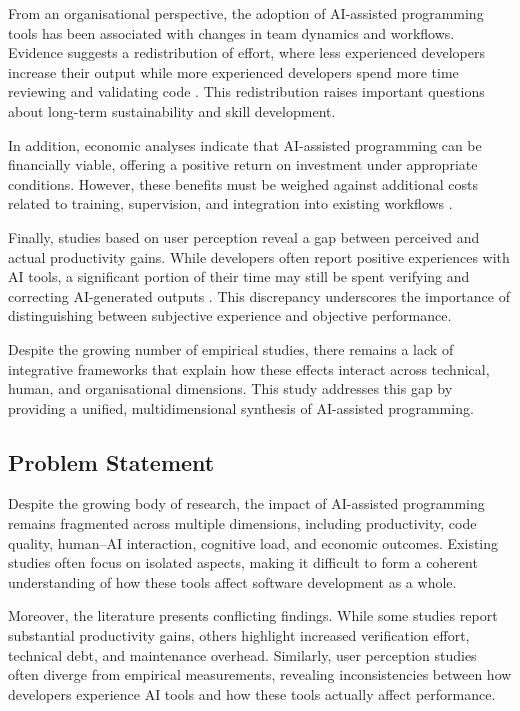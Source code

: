 \documentclass[conference]{IEEEtran}
\begin{document}
From an organisational perspective, the adoption of AI-assisted programming tools has been associated with changes in team dynamics and workflows. Evidence suggests a redistribution of effort, where less experienced developers increase their output while more experienced developers spend more time reviewing and validating code \cite{koripalli_copilot_2025}. This redistribution raises important questions about long-term sustainability and skill development.

In addition, economic analyses indicate that AI-assisted programming can be financially viable, offering a positive return on investment under appropriate conditions. However, these benefits must be weighed against additional costs related to training, supervision, and integration into existing workflows \cite{rodriguez_comparative_2025}.

Finally, studies based on user perception reveal a gap between perceived and actual productivity gains. While developers often report positive experiences with AI tools, a significant portion of their time may still be spent verifying and correcting AI-generated outputs \cite{lyu_my_2025}. This discrepancy underscores the importance of distinguishing between subjective experience and objective performance.

Despite the growing number of empirical studies, there remains a lack of integrative frameworks that explain how these effects interact across technical, human, and organisational dimensions. This study addresses this gap by providing a unified, multidimensional synthesis of AI-assisted programming.

\subsection{Problem Statement}

Despite the growing body of research, the impact of AI-assisted programming remains fragmented across multiple dimensions, including productivity, code quality, human--AI interaction, cognitive load, and economic outcomes. Existing studies often focus on isolated aspects, making it difficult to form a coherent understanding of how these tools affect software development as a whole.

Moreover, the literature presents conflicting findings. While some studies report substantial productivity gains, others highlight increased verification effort, technical debt, and maintenance overhead. Similarly, user perception studies often diverge from empirical measurements, revealing inconsistencies between how developers experience AI tools and how these tools actually affect performance.
\end{document}
